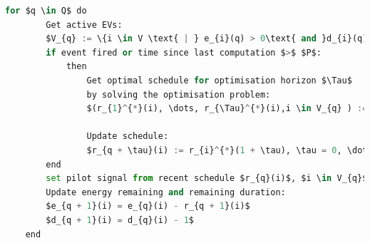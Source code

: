 
\begin{lstlisting}[language=Python,basicstyle=\ttfamily,mathescape=true]
    for $q \in Q$ do
        Get active EVs:
        $V_{q} := \{i \in V \text{ | } e_{i}(q) > 0\text{ and }d_{i}(q) > 0\}$
        if event fired or time since last computation $>$ $P$:
            then 
                Get optimal schedule for optimisation horizon $\Tau$
                by solving the optimisation problem:
                $(r_{1}^{*}(i), \dots, r_{\Tau}^{*}(i),i \in V_{q} ) := solver(V_{q},U_{q},R_{q})$

                Update schedule:
                $r_{q + \tau}(i) := r_{i}^{*}(1 + \tau), \tau = 0, \dots, \Tau - 1 $
        end 
        set pilot signal from recent schedule $r_{q}(i)$, $i \in V_{q}$
        Update energy remaining and remaining duration:
        $e_{q + 1}(i) = e_{q}(i) - r_{q + 1}(i)$
        $d_{q + 1}(i) = d_{q}(i) - 1$
    end
\end{lstlisting}
















